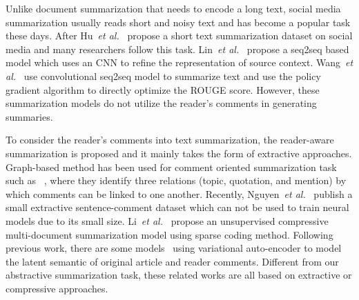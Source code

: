 \documentclass[letterpaper]{article} %
\newcommand{\etal}{\emph{et al.}\xspace}
\begin{document}
Unlike document summarization that needs to encode a long text, social media summarization usually reads short and noisy text and has become a popular task these days.
After Hu~\etal~ propose a short text summarization dataset on social media and many researchers follow this task.
Lin~\etal~ propose a seq2seq based model which uses an CNN to refine the representation of source context.
Wang~\etal~ use convolutional seq2seq model to summarize text and use the policy gradient algorithm to directly optimize the ROUGE score.
However, these summarization models do not utilize the reader's comments in generating summaries.

To consider the reader's comments into text summarization, the reader-aware summarization is proposed and it mainly takes the form of extractive approaches. 
Graph-based method has been used for comment oriented summarization task such as ~\cite{Hu2007CommentsorientedBS,Hu2008CommentsorientedDS},  where they identify three relations (topic, quotation, and mention) by which comments can be linked to one another.
Recently, Nguyen~\etal~ publish a small extractive sentence-comment dataset which can not be used to train neural models due to its small size. 
Li~\etal~ propose an unsupervised compressive multi-document summarization model using sparse coding method.
Following previous work, there are some models~\cite{li2017reader,Li2017SalienceEV} using variational auto-encoder to model the latent semantic of original article and reader comments.
Different from our abstractive summarization task, these related works are all based on extractive or compressive approaches.
\end{document}
